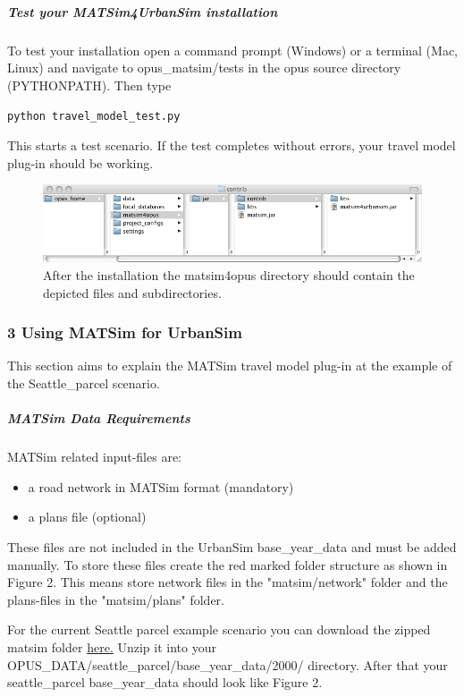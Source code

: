 \subparagraph{Test your MATSim4UrbanSim installation}

To test your installation open a command prompt (Windows) or a  terminal (Mac, Linux) and navigate to opus\_matsim/tests in the opus  source directory (PYTHONPATH). Then type


\texttt{python travel\_model\_test.py}

This starts a test scenario. If the test completes without errors, your travel model plug-in should be working.

\begin{figure}[htp]
\includegraphics[width=\textwidth]{figures/matsim4urbansim/structure.png}
\caption{After the installation the matsim4opus directory should contain the depicted files and subdirectories.}
\end{figure}

\subsubsection{3 Using MATSim for UrbanSim}

This section aims to explain the MATSim travel model plug-in at the example of the Seattle\_parcel scenario.\textbf{}

\subparagraph{MATSim Data Requirements}

MATSim related input-files are:
\begin{itemize}
	\item a road network in MATSim format (mandatory)
	\item a plans file (optional)
\end{itemize}

These files are not included in the UrbanSim base\_year\_data and  must be added manually. To store these files create the red marked  folder structure as shown in Figure 2. This means store network files in  the "matsim/network" folder and the plans-files in the "matsim/plans"  folder.

For the current Seattle parcel example scenario you can download the zipped matsim folder \href{https://svn.vsp.tu-berlin.de/repos/public-svn/matsim/examples/countries/us/seattle/matsim.zip}{here.}  Unzip it into your OPUS\_DATA/seattle\_parcel/base\_year\_data/2000/  directory. After that your seattle\_parcel base\_year\_data should look  like Figure 2.

